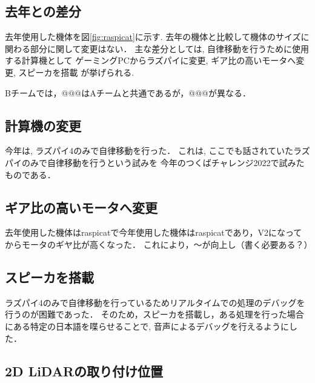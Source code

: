 \documentclass[twocolumn,9pt]{jsproceedings}
\begin{document}
\subsection{去年との差分} %
 
去年使用した機体を図\ref{fig:raspicat}に示す. 
去年の機体と比較して機体のサイズに関わる部分に関して変更はない．
主な差分としては, 自律移動を行うために使用する計算機として
ゲーミングPCからラズパイに変更, ギア比の高いモータへ変更, スピーカを搭載
が挙げられる.

Bチームでは，@@@はAチームと共通であるが，@@@が異なる．



\subsection{計算機の変更}

今年は, ラズパイ4のみで自律移動を行った．%
これは, ここでも話されていたラズパイのみで自律移動を行うという試みを
今年のつくばチャレンジ2022で試みたものである．

\subsection{ギア比の高いモータへ変更}

去年使用した機体はraspicatで今年使用した機体はraspicatであり，V2になってからモータのギヤ比が高くなった．
これにより，〜が向上し（書く必要ある？）%

\subsection{スピーカを搭載}

ラズパイ4のみで自律移動を行っているためリアルタイムでの処理のデバッグを行うのが困難であった．
そのため，スピーカを搭載し，ある処理を行った場合にある特定の日本語を喋らせることで, 
音声によるデバッグを行えるようにした．%

\subsection{2D LiDARの取り付け位置}
\end{document}
